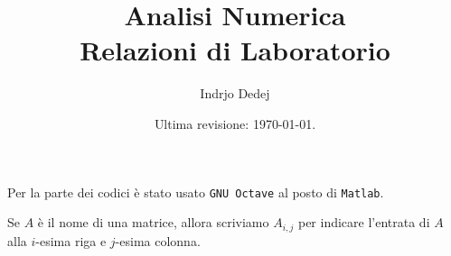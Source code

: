 


\title{Analisi Numerica \\ Relazioni di Laboratorio}
\author{Indrjo Dedej}
\date{Ultima revisione: \today{}.}



\maketitle

\tableofcontents

\begin{nota}
Per la parte dei codici è stato usato {\tt GNU Octave} al posto di {\tt Matlab}.
\end{nota}

\begin{nota}
Se \(A\) è il nome di una matrice, allora scriviamo \(A_{i,j}\) per indicare l'entrata di \(A\) alla \(i\)-esima riga e \(j\)-esima colonna.
\end{nota}




